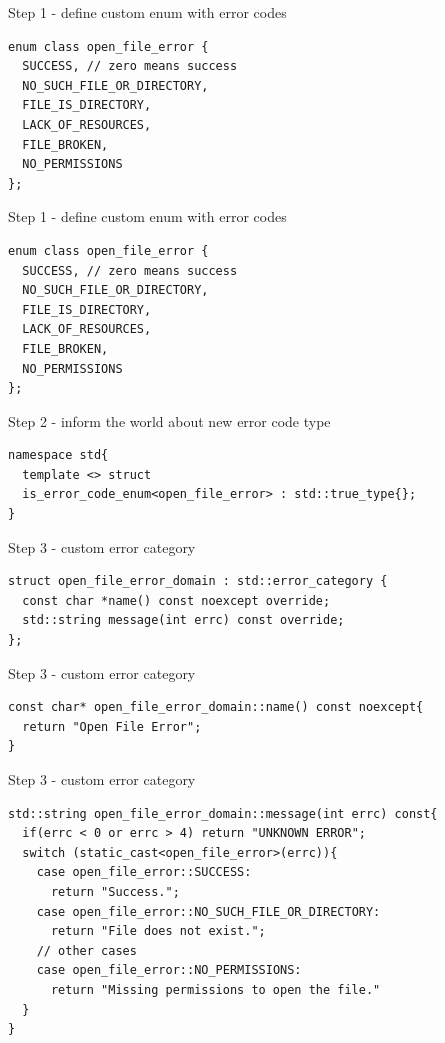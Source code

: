 \documentclass[10pt]{beamer}
\begin{document}
\begin{frame}[fragile]{Step 1 - define custom enum with error codes}
\begin{verbatim}
enum class open_file_error {
  SUCCESS, // zero means success
  NO_SUCH_FILE_OR_DIRECTORY,
  FILE_IS_DIRECTORY,
  LACK_OF_RESOURCES,
  FILE_BROKEN,
  NO_PERMISSIONS
};
\end{verbatim}
\end{frame}

\begin{frame}[fragile]{Step 1 - define custom enum with error codes}
\begin{verbatim}
enum class open_file_error {
  SUCCESS, // zero means success
  NO_SUCH_FILE_OR_DIRECTORY,
  FILE_IS_DIRECTORY,
  LACK_OF_RESOURCES,
  FILE_BROKEN,
  NO_PERMISSIONS
};
\end{verbatim}
\end{frame}

\begin{frame}[fragile]{Step 2 - inform the world about new error code type}
\begin{verbatim}
namespace std{
  template <> struct
  is_error_code_enum<open_file_error> : std::true_type{};
}
\end{verbatim}
	
\end{frame}

\begin{frame}[fragile]{Step 3 - custom error category}
	
	\begin{verbatim}
struct open_file_error_domain : std::error_category {
  const char *name() const noexcept override;		
  std::string message(int errc) const override;
};
	\end{verbatim}
\end{frame}

\begin{frame}[fragile]{Step 3 - custom error category}
\begin{verbatim}
const char* open_file_error_domain::name() const noexcept{
  return "Open File Error";
}
\end{verbatim}
\end{frame}

\begin{frame}[fragile]{Step 3 - custom error category}
	\begin{verbatim}
std::string open_file_error_domain::message(int errc) const{
  if(errc < 0 or errc > 4) return "UNKNOWN ERROR";
  switch (static_cast<open_file_error>(errc)){
    case open_file_error::SUCCESS:
      return "Success.";
    case open_file_error::NO_SUCH_FILE_OR_DIRECTORY:
      return "File does not exist.";
    // other cases
    case open_file_error::NO_PERMISSIONS:
      return "Missing permissions to open the file."
  }
}
	\end{verbatim}
\end{frame}
\end{document}
